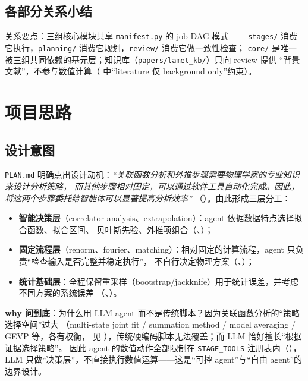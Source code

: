 \documentclass[UTF8]{ctexart}
\begin{document}
\subsection{各部分关系小结}

\textcolor{relation}{关系要点}：三组核心模块共享 \texttt{manifest.py} 的 job-DAG 模式——
\texttt{stages/} 消费它执行，\texttt{planning/} 消费它规划，\texttt{review/} 消费它做一致性检查；
\verb|core/| 是唯一被三组共同依赖的基元层；知识库（\texttt{papers/lamet\_kb/}）只向 review 提供
“背景文献”，不参与数值计算（\texttt{} 中“literature 仅 background only”约束）。

\section{项目思路}

\subsection{设计意图}

\texttt{PLAN.md} 明确点出设计动机：\emph{“关联函数分析和外推步骤需要物理学家的专业知识来设计分析策略，
而其他步骤相对固定，可以通过软件工具自动化完成。因此，将这两个步骤委托给智能体可以显著提高分析效率”}
（\texttt{}）。由此形成三层分工：

\begin{itemize}
\item \textbf{智能决策层}（correlator analysis、extrapolation）：agent 依据数据特点选择拟合函数、拟合区间、
贝叶斯先验、外推项组合（\texttt{}、\texttt{}）；
\item \textbf{固定流程层}（renorm、fourier、matching）：相对固定的计算流程，agent 只负责“检查输入是否完整并稳定执行”，
不自行决定物理方案（\texttt{}、\texttt{}）；
\item \textbf{统计基础层}：全程保留重采样（bootstrap/jackknife）用于统计误差，并考虑不同方案的系统误差
（\texttt{}、\texttt{}）。
\end{itemize}

\textbf{why 问到底}：为什么用 LLM agent 而不是传统脚本？因为关联函数分析的“策略选择空间”过大
（multi-state joint fit / summation method / model averaging / GEVP 等，各有权衡，
见 \texttt{}），传统硬编码脚本无法覆盖；而 LLM 恰好擅长“根据证据选择策略”。
因此 agent 的数值动作全部限制在 \texttt{STAGE\_TOOLS} 注册表内（\texttt{}），
LLM 只做“决策层”，不直接执行数值运算——这是“可控 agent”与“自由 agent”的边界设计。
\end{document}
